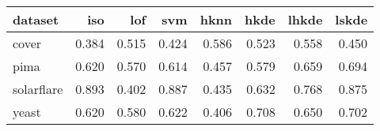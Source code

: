 \begin{tabular}{l|rrr|rrrr}
  \toprule
dataset & iso & lof & svm & hknn & hkde & lhkde & lskde \\ 
  \midrule
cover & 0.384 & 0.515 & 0.424 & 0.586 & 0.523 & 0.558 & 0.450 \\ 
  pima & 0.620 & 0.570 & 0.614 & 0.457 & 0.579 & 0.659 & 0.694 \\ 
  solarflare & 0.893 & 0.402 & 0.887 & 0.435 & 0.632 & 0.768 & 0.875 \\ 
  yeast & 0.620 & 0.580 & 0.622 & 0.406 & 0.708 & 0.650 & 0.702 \\ 
   \bottomrule
\end{tabular}
